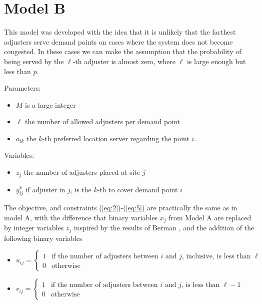 
\section{Model B}

This model
was developed with the idea
that it is unlikely that the farthest adjusters
serve demand points
on cases where the system does not become congested.
In these cases
we can make the assumption that
the probability of being served by the $\ell$-th 
adjuster is almost zero,
where $\ell$ is large enough but less than $p$.

Parameters:
\begin{itemize}
\item $M$ is a large integer
\item $\ell$ the number of allowed adjusters per demand point
\item $a_{ik}$ the $k$-th preferred location server
  regarding the point $i$.
\end{itemize}

Variables:
\begin{itemize}
\item $z_j$ the number of adjusters placed at site $j$
\item $y_{ij}^k$ if adjuster in $j$,
  is the $k$-th to cover demand point $i$
\end{itemize}

The objective,
and constraints (\ref{eq:2})-(\ref{eq:5})
are practically the same as in model A,
with the difference that
binary variables $x_j$ from Model A
are replaced by integer variables $z_j$
inspired by the results of Berman \cite{berman1987stochastic},
and the addition of the following binary variables
\begin{itemize}
\item $u_{ij} = 
  \begin{cases}
    1 & \mbox{if the number of adjusters between } i 
    \mbox{ and } j \mbox{, inclusive, is less than } \ell \\
    0 & \mbox{otherwise}
  \end{cases}$
\item $v_{ij} = 
  \begin{cases} 
    1 & \mbox{if the number of adjusters between } i
    \mbox{ and } j \mbox{, is less than } \ell - 1 \\
    0 & \mbox{otherwise}
  \end{cases}$
\end{itemize}

